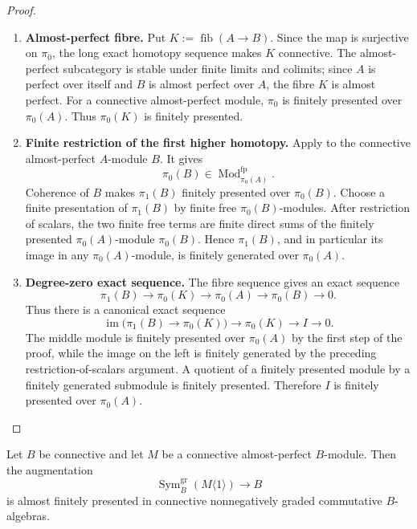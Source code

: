 \begin{proof}
\leavevmode
\begin{enumerate}[label=\textup{(\arabic*)}]
    \item \textbf{Almost-perfect fibre.}
    Put \(K:=\operatorname{fib}(A\to B)\). Since the map is surjective on
    \(\pi_0\), the long exact homotopy sequence makes \(K\) connective. The
    almost-perfect subcategory is stable under finite limits and colimits; since
    \(A\) is perfect over itself and \(B\) is almost perfect over \(A\), the fibre
    \(K\) is almost perfect. For a connective almost-perfect module,
    \(\pi_0\) is finitely presented over \(\pi_0(A)\). Thus \(\pi_0(K)\) is
    finitely presented.
    \item \textbf{Finite restriction of the first higher homotopy.}
    Apply  to the connective
    almost-perfect \(A\)-module \(B\). It gives
    \[
        \pi_0(B)\in\operatorname{Mod}_{\pi_0(A)}^{\mathrm{fp}}.
    \]
    Coherence of \(B\) makes \(\pi_1(B)\) finitely presented over
    \(\pi_0(B)\). Choose a finite presentation of \(\pi_1(B)\) by finite free
    \(\pi_0(B)\)-modules. After restriction of scalars, the two finite free
    terms are finite direct sums of the finitely presented
    \(\pi_0(A)\)-module \(\pi_0(B)\). Hence \(\pi_1(B)\), and in particular
    its image in any \(\pi_0(A)\)-module, is finitely generated over
    \(\pi_0(A)\).
    \item \textbf{Degree-zero exact sequence.}
    The fibre sequence gives an exact sequence
    \[
        \pi_1(B)
        \longrightarrow
        \pi_0(K)
        \longrightarrow
        \pi_0(A)
        \longrightarrow
        \pi_0(B)
        \longrightarrow0.
    \]
    Thus there is a canonical exact sequence
    \[
        \operatorname{im}\bigl(\pi_1(B)\to\pi_0(K)\bigr)
        \longrightarrow
        \pi_0(K)
        \longrightarrow
        I
        \longrightarrow0.
    \]
    The middle module is finitely presented over \(\pi_0(A)\) by the first
    step of the proof, while the image on the left is finitely generated by
    the preceding restriction-of-scalars argument. A quotient of a finitely
    presented module by a finitely generated submodule is finitely presented.
    Therefore \(I\) is finitely presented over \(\pi_0(A)\).
\end{enumerate}
\end{proof}

\begin{lemma}
\label{lem:positive-graded-symmetric-aft}
Let \(B\) be connective and let \(M\) be a connective almost-perfect
\(B\)-module. Then the augmentation
\[
    \operatorname{Sym}^{\mathrm{gr}}_B(M\langle1\rangle)
    \longrightarrow
    B
\]
is almost finitely presented in connective nonnegatively graded commutative
\(B\)-algebras.
\end{lemma}

